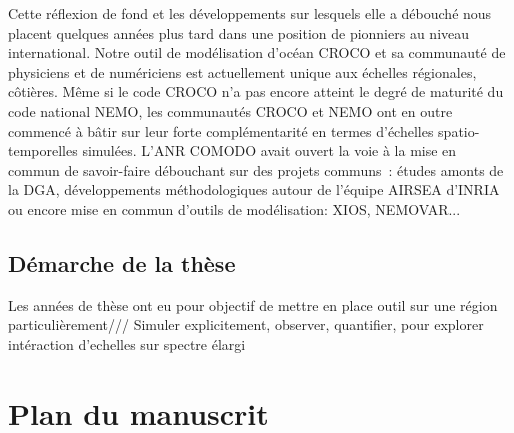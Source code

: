 Cette réflexion de fond et les développements sur lesquels elle a débouché nous placent quelques années plus tard dans une position de pionniers au niveau international. Notre outil de modélisation d’océan CROCO et sa communauté de physiciens et de numériciens est actuellement unique aux échelles régionales, côtières. Même si le code CROCO n’a pas encore atteint le degré de maturité du code national NEMO, les communautés CROCO et NEMO ont en outre commencé à bâtir sur leur forte complémentarité en termes d’échelles spatio-temporelles simulées. L’ANR COMODO avait ouvert la voie à la mise en commun de savoir-faire débouchant sur des projets communs : études amonts de la DGA, développements méthodologiques autour de l’équipe AIRSEA d’INRIA ou encore mise en commun d’outils de modélisation: XIOS, NEMOVAR...

\subsection{Démarche de la thèse}
Les années de thèse ont eu pour objectif de mettre en place outil sur une région particulièrement/// Simuler explicitement, observer, quantifier, pour explorer intéraction d'echelles sur spectre élargi


\section{Plan du manuscrit}






